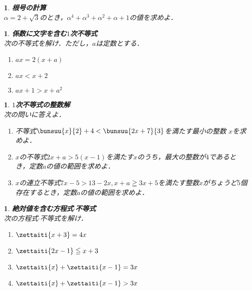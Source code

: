 \documentclass[10pt,
fleqn,
dvipdfmx,
uplatex
]{jsarticle}
\newtheorem{question}[Question]{}
\begin{document}
\begin{question}{\bf\boldmath 根号の計算}\\
$\alpha =2+\sqrt 3$のとき，$\alpha ^4+\alpha ^3+\alpha ^2+\alpha +1$の値を求めよ．
\end{question}



\begin{question}{\bf\boldmath 係数に文字を含む$1$次不等式}\\
次の不等式を解け．ただし，$a$は定数とする．
\begin{enumerate}
\item $ax=2\left(x+a\right)$
\item $ax<x+2$
\item $ax+1>x+a^2$
\end{enumerate}

\end{question}



\begin{question}{\bf\boldmath $1$次不等式の整数解}\\
次の問いに答えよ．
\begin{enumerate}
\item 不等式$\bunsuu{x}{2}+4<\bunsuu{{2x+7}}{3}$を満たす最小の整数
$x$を求めよ．
\item $x$の不等式$2x+a>5\left(x-1\right)$を満たす$x$のうち，最大の整数が$4$であるとき，定数$a$の値の範囲を求めよ．
\item $x$の連立不等式$7x-5>{13}-2x, x+a\geqq 3x+5$を満たす整数$x$がちょうど$5$個存在するとき，定数$a$の値の範囲を求めよ．
\end{enumerate}

\end{question}



\begin{question}{\bf\boldmath 絶対値を含む方程式$\cdot$不等式}\\
次の方程式$\cdot$不等式を解け．
\begin{enumerate}
\item $\zettaiti{x+3}=4x$
\item $\zettaiti{2x-1}\leqq x+3$
\item $\zettaiti{x}+\zettaiti{x-1}=3x$
\item $\zettaiti{x}+\zettaiti{x-1}>3x$
\end{enumerate}

\end{question}
\end{document}
